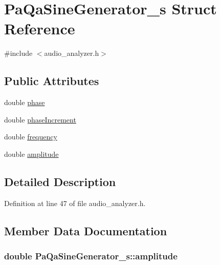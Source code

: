\hypertarget{struct_pa_qa_sine_generator__s}{}\section{Pa\+Qa\+Sine\+Generator\+\_\+s Struct Reference}
\label{struct_pa_qa_sine_generator__s}


{\ttfamily \#include $<$audio\+\_\+analyzer.\+h$>$}

\subsection*{Public Attributes}
\begin{DoxyCompactItemize}
\item 
double \hyperlink{struct_pa_qa_sine_generator__s_a6a53658f28e435c3c7bdd47e36859826}{phase}
\item 
double \hyperlink{struct_pa_qa_sine_generator__s_a7939455f258b2ba52aade79672f3d5ea}{phase\+Increment}
\item 
double \hyperlink{struct_pa_qa_sine_generator__s_ae73569f3aa4212befb0fc87df74d6a7d}{frequency}
\item 
double \hyperlink{struct_pa_qa_sine_generator__s_a8f0027443ba30c1c5e57c88364cec465}{amplitude}
\end{DoxyCompactItemize}


\subsection{Detailed Description}


Definition at line 47 of file audio\+\_\+analyzer.\+h.



\subsection{Member Data Documentation}
\subsubsection[{\texorpdfstring{amplitude}{amplitude}}]{\setlength{\rightskip}{0pt plus 5cm}double Pa\+Qa\+Sine\+Generator\+\_\+s\+::amplitude}\hypertarget{struct_pa_qa_sine_generator__s_a8f0027443ba30c1c5e57c88364cec465}{}\label{struct_pa_qa_sine_generator__s_a8f0027443ba30c1c5e57c88364cec465}


